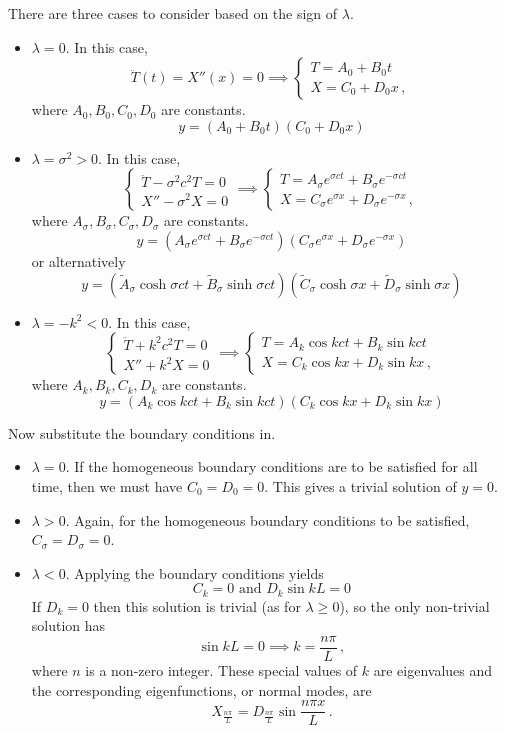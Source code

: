 \documentclass{article}
\theoremstyle{plain}\theoremheaderfont{\normalfont\itshape}\theorembodyfont{\rmfamily}\theoremseparator{.}\newtheorem*{rem}{Remark}\newtheorem*{ex}{Example}\newtheorem*{proof}{Proof}\newtheorem*{altp}{Alternative proof}
\theoremstyle{plain}\theoremheaderfont{\normalfont\bfseries}\theorembodyfont{\rmfamily}\theoremseparator{.}\newtheorem{thm}{Theorem}[section]\newtheorem{lem}[thm]{Lemma}\newtheorem{prop}[thm]{Proposition}\newtheorem*{cor}{Corollary}\newtheorem{defn}[thm]{Definition}\newtheorem{clm}[thm]{Claim}\newtheorem{clminproof}{Claim}
\theoremstyle{break}\theoremheaderfont{\normalfont\itshape}\theorembodyfont{\rmfamily}\theoremseparator{.\medskip}\newtheorem*{proofskip}{Proof}\newtheorem*{exs}{Examples}\newtheorem*{rems}{Remarks}
\theoremstyle{break}\theoremheaderfont{\normalfont\bfseries}\theorembodyfont{\rmfamily}\theoremseparator{.\medskip}\newtheorem{lemskip}[thm]{Lemma}\newtheorem{defnskip}[thm]{Definition}\newtheorem{propskip}[thm]{Proposition}\newtheorem{thmskip}[thm]{Theorem}
\numberwithin{equation}{section}
\begin{document}
	There are three cases to consider based on the sign of \(\lambda\).
	\begin{itemize}[topsep=0pt]
		\item \(\lambda=0\). In this case,
		\[\ddot{T}(t)=X''(x)=0 \implies \begin{cases}
			T=A_0+B_0 t\\
			X=C_0+D_0 x\,,
		\end{cases}\]
		where \(A_0,B_0,C_0,D_0\) are constants.
		\[y=(A_0+B_0t)(C_0+D_0x)\]

		\item \(\lambda=\sigma^2>0\). In this case,
		\[\begin{cases}
			\ddot{T}-\sigma^2c^2T=0\\
			X''-\sigma^2X=0
		\end{cases}\implies\begin{cases}
		T=A_\sigma e^{\sigma ct}+B_\sigma e^{-\sigma ct}\\
		X=C_\sigma e^{\sigma x}+D_\sigma e^{-\sigma x}\,,
		\end{cases}\]
		where \(A_\sigma,B_\sigma,C_\sigma,D_\sigma\) are constants.
		\[y=(A_\sigma e^{\sigma ct}+B_\sigma e^{-\sigma ct})(C_\sigma e^{\sigma x}+D_\sigma e^{-\sigma x})\]
		or alternatively
		\[y=(\tilde{A}_\sigma\cosh\sigma ct+\tilde{B}_\sigma\sinh\sigma ct)(\tilde{C}_\sigma\cosh\sigma x+\tilde{D}_\sigma\sinh\sigma x)\]

		\item \(\lambda=-k^2<0\). In this case,
		\[\begin{cases}
			\ddot{T}+k^2c^2T=0\\
			X''+k^2X=0
		\end{cases}\implies\begin{cases}
			T=A_k \cos kct+B_k \sin kct\\
			X=C_k \cos kx+D_k \sin kx\,,
		\end{cases}\]
		where \(A_k,B_k,C_k,D_k\) are constants.
		\[y=(A_k \cos kct+B_k \sin kct)(C_k \cos kx+D_k \sin kx)\]
	\end{itemize}

	Now substitute the boundary conditions in.
	\begin{itemize}[topsep=0pt]
		\item \(\lambda=0\). If the homogeneous boundary conditions are to be satisfied for all time, then we must have \(C_0=D_0=0\). This gives a trivial solution of \(y=0\).
		\item \(\lambda>0\). Again, for the homogeneous boundary conditions to be satisfied, \(C_\sigma=D_\sigma=0\).
		\item \(\lambda<0\). Applying the boundary conditions yields
		\[C_k=0\text{ and }D_k\sin kL=0\]
		If \(D_k=0\) then this solution is trivial (as for \(\lambda\ge 0\)), so the only non-trivial solution has
		\[\sin kL=0\implies k=\frac{n\pi}{L}\,,\]
		where \(n\) is a non-zero integer. These special values of \(k\) are eigenvalues and the corresponding eigenfunctions, or normal modes, are
		\[X_{\frac{n\pi}{L}}=D_{\frac{n\pi}{L}} \sin\frac{n\pi x}{L}\,.\]
	\end{itemize}
	
\end{document}
